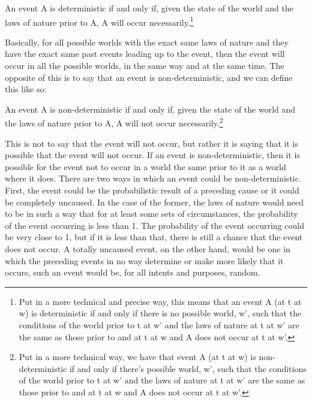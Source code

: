 \begin{center}An event A is deterministic if and only if, given the state of the world and the laws of nature prior to A, A will occur necessarily.\footnote{Put in a more technical and precise way, this means that an event A (at t at w) is deterministic if and only if there is no possible world, w’, such that the conditions of the world prior to t at w’ and the laws of nature at t at w’ are the same as those prior to and at t at w and A does not occur at t at w’.}
\end{center}
Basically, for all possible worlds with the exact same laws of nature and they have the exact same past events leading up to the event, then the event will occur in all the possible worlds, in the same way and at the same time. The opposite of this is to say that an event is non-deterministic, and we can define this like so:
\begin{center}
An event A is non-deterministic if and only if, given the state of the world and the laws of nature prior to A, A will not occur necessarily.\footnote{Put in a more technical way, we have that event A (at t at w) is non-deterministic if and only if there’s possible world, w’, such that the conditions of the world prior to t at w’ and the laws of nature at t at w’ are the same as those prior to and at t at w and A does not occur at t at w’.}
\end{center}
This is not to say that the event will not occur, but rather it is saying that it is possible that the event will not occur. If an event is non-deterministic, then it is possible for the event not to occur in a world the same prior to it as a world where it does. There are two ways in which an event could be non-deterministic. First, the event could be the probabilistic result of a preceding cause or it could be completely uncaused. In the case of the former, the laws of nature would need to be in such a way that for at least some sets of circumstances, the probability of the event occurring is less than 1. The probability of the event occurring could be very close to 1, but if it is less than that, there is still a chance that the event does not occur. A totally uncaused event, on the other hand, would be one in which the preceding events in no way determine or make more likely that it occurs, such an event would be, for all intents and purposes, random.

